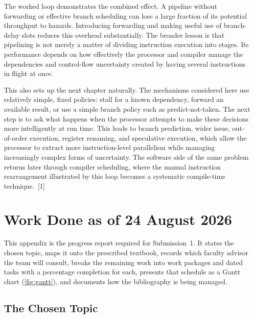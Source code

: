 \documentclass[11pt,a4paper]{report}
\begin{document}
The worked loop demonstrates the combined effect. A pipeline without forwarding or effective branch scheduling can lose a large fraction of its potential throughput to hazards. Introducing forwarding and making useful use of branch-delay slots reduces this overhead substantially. The broader lesson is that pipelining is not merely a matter of dividing instruction execution into stages. Its performance depends on how effectively the processor and compiler manage the dependencies and control-flow uncertainty created by having several instructions in flight at once.

This also sets up the next chapter naturally. The mechanisms considered here use relatively simple, fixed policies: stall for a known dependency, forward an available result, or use a simple branch policy such as predict-not-taken. The next step is to ask what happens when the processor attempts to make these decisions more intelligently at run time. This leads to branch prediction, wider issue, out-of-order execution, register renaming, and speculative execution, which allow the processor to extract more instruction-level parallelism while managing increasingly complex forms of uncertainty. The software side of the same problem returns later through compiler scheduling, where the manual instruction rearrangement illustrated by this loop becomes a systematic compile-time technique.~[1]



\appendix

\chapter{Work Done as of 24 August 2026}
\label{app:progress}

This appendix is the progress report required for Submission~1. It
states the chosen topic, maps it onto the prescribed textbook, records
which faculty advisor the team will consult, breaks the remaining work
into work packages and dated tasks with a percentage completion for
each, presents that schedule as a Gantt chart
(\cref{fig:gantt}), and documents how the bibliography is being managed.

\section{The Chosen Topic}
\label{sec:topic}
\end{document}
